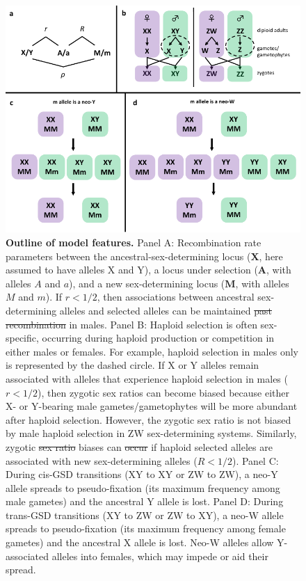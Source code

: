 \documentclass[10pt,letterpaper]{article}
\providecommand{\DIFaddtex}[1]{{\protect\color{blue}\uwave{#1}}} %
\providecommand{\DIFdeltex}[1]{{\protect\color{red}\sout{#1}}}                      %
\providecommand{\DIFaddFL}[1]{\DIFadd{#1}} %
\providecommand{\DIFdelFL}[1]{\DIFdel{#1}} %
\providecommand{\DIFaddbeginFL}{} %
\providecommand{\DIFaddendFL}{} %
\providecommand{\DIFdelbeginFL}{} %
\providecommand{\DIFdelendFL}{} %
\providecommand{\DIFadd}[1]{\texorpdfstring{\DIFaddtex{#1}}{#1}} %
\providecommand{\DIFdel}[1]{\texorpdfstring{\DIFdeltex{#1}}{}} %
\newcommand{\DIFscaledelfig}{0.5}
\newlength{\DIFdelgraphicswidth} %
\newlength{\DIFdelgraphicsheight} %
\newcommand{\DIFaddincludegraphics}[2][]{{\color{blue}\fbox{\DIFOincludegraphics[#1]{#2}}}} %
\newcommand{\DIFdelincludegraphics}[2][]{%
\sbox{\DIFdelgraphicsbox}{\DIFOincludegraphics[#1]{#2}}%
\settoboxwidth{\DIFdelgraphicswidth}{\DIFdelgraphicsbox} %
\settoboxtotalheight{\DIFdelgraphicsheight}{\DIFdelgraphicsbox} %
\scalebox{\DIFscaledelfig}{%
\parbox[b]{\DIFdelgraphicswidth}{\usebox{\DIFdelgraphicsbox}\\[-\baselineskip] \rule{\DIFdelgraphicswidth}{0em}}\llap{\resizebox{\DIFdelgraphicswidth}{\DIFdelgraphicsheight}{%
\setlength{\unitlength}{\DIFdelgraphicswidth}%
\begin{picture}(1,1)%
\thicklines\linethickness{2pt} %
{\color[rgb]{1,0,0}\put(0,0){\framebox(1,1){}}}%
{\color[rgb]{1,0,0}\put(0,0){\line( 1,1){1}}}%
{\color[rgb]{1,0,0}\put(0,1){\line(1,-1){1}}}%
\end{picture}%
}\hspace*{3pt}}} %
} %
\DeclareRobustCommand{\DIFaddbeginFL}{\DIFOaddbeginFL \let\includegraphics\DIFaddincludegraphics} %
\DeclareRobustCommand{\DIFaddendFL}{\DIFOaddendFL \let\includegraphics\DIFOincludegraphics} %
\DeclareRobustCommand{\DIFdelbeginFL}{\DIFOdelbeginFL \let\includegraphics\DIFdelincludegraphics} %
\DeclareRobustCommand{\DIFdelendFL}{\DIFOaddendFL \let\includegraphics\DIFOincludegraphics} %
\begin{document}
\begin{figure}[!h]
\DIFaddbeginFL \centerline{\includegraphics[width=\linewidth]{../Plots/Sex_determination_outline.pdf}}
\DIFaddendFL \caption{
{\bf Outline of model features.}
Panel A: Recombination rate parameters between the ancestral-sex-determining locus ($\mathbf{X}$, here assumed to have alleles X and Y), a locus under selection ($\mathbf{A}$, with alleles $A$ and $a$), and a new sex-determining locus ($\mathbf{M}$, with alleles $M$ and $m$). 
If $r<1/2$, then associations between ancestral sex-determining alleles and selected alleles can be maintained \DIFdelbeginFL \DIFdelFL{past recombination }\DIFdelendFL in males. 
Panel B: Haploid selection is often sex-specific, occurring during haploid production or competition in either males or females. 
For example, haploid selection in males only is represented by the dashed circle.  
If X or Y alleles remain associated with alleles that experience haploid selection in males ($r<1/2$), then zygotic sex ratios can become biased because either X- or Y-bearing male gametes/gametophytes will be more abundant after haploid selection. 
However, the zygotic sex ratio is not biased by male haploid selection in ZW sex-determining systems. 
Similarly, zygotic \DIFdelbeginFL \DIFdelFL{sex ratio }\DIFdelendFL \DIFaddbeginFL \DIFaddFL{sex-ratio }\DIFaddendFL biases can \DIFdelbeginFL \DIFdelFL{occur }\DIFdelendFL \DIFaddbeginFL \DIFaddFL{arise }\DIFaddendFL if haploid selected alleles are associated with new sex-determining alleles ($R<1/2$). 
Panel C: During cis-GSD transitions (XY to XY or ZW to ZW), a neo-Y allele spreads to pseudo-fixation (its maximum frequency among male gametes) and the ancestral Y allele is lost. 
Panel D: During trans-GSD transitions (XY to ZW or ZW to XY), a neo-W allele spreads to pseudo-fixation (its maximum frequency among female gametes) and the ancestral X allele is lost. 
Neo-W alleles allow Y-associated alleles into females, which may impede or aid their spread. 
}
\label{fig:model_outline}
\end{figure}
\end{document}
